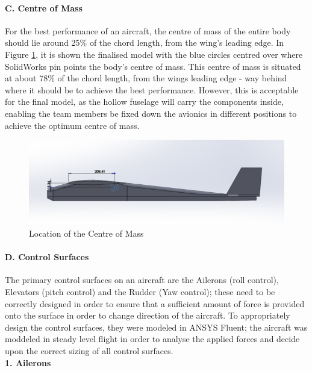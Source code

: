 \documentclass[12pt]{article}
\begin{document}
\paragraph{C. Centre of Mass} For the best performance of an aircraft, the centre of mass of the entire body should lie around 25\% of the chord length, from the wing's leading edge. In Figure \ref{masscentre}, it is shown the finalised model with the blue circles centred over where SolidWorks pin points the body’s centre of mass. This centre of mass is situated at about 78\% of the chord length, from the wings leading edge - way behind where it should be to achieve the best performance. However, this is acceptable for the final model, as the hollow fuselage will carry the components inside, enabling the team members be fixed down the avionics in different positions to achieve the optimum centre of mass.

\begin{figure}[h!]
    \includegraphics{centremass.png}
    \caption{Location of the Centre of Mass}
    \label{masscentre}
\end{figure}

\paragraph{D. Control Surfaces} The primary control surfaces on an aircraft are the Ailerons (roll control), Elevators (pitch control) and the Rudder (Yaw control); these need to be correctly designed in order to ensure that a sufficient amount of force is provided onto the surface in order to change direction of the aircraft. To appropriately design the control surfaces, they were modeled in ANSYS Fluent; the aircraft was moddeled in steady level flight in order to analyse the applied forces and decide upon the correct sizing of all control surfaces. \\

\noindent \textbf{1. Ailerons} \\
\end{document}
